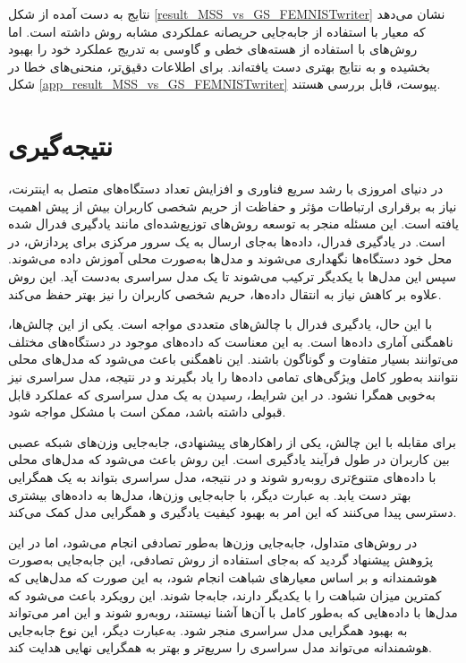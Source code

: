 نتایج به دست آمده از شکل
\ref{result_MSS_vs_GS_FEMNISTwriter}
نشان می‌دهد که معیار
با استفاده از جابه‌جایی حریصانه عملکردی مشابه روش
داشته است. اما روش‌های
با استفاده از هسته‌های خطی و گاوسی به تدریج عملکرد خود را بهبود بخشیده و به نتایج بهتری دست یافته‌اند. برای اطلاعات دقیق‌تر، منحنی‌های خطا در شکل
\ref{app_result_MSS_vs_GS_FEMNISTwriter}
پیوست، قابل بررسی هستند.




\section{نتیجه‌گیری}

در دنیای امروزی با رشد سریع فناوری و افزایش تعداد دستگاه‌های متصل به اینترنت، نیاز به برقراری ارتباطات مؤثر و حفاظت از حریم شخصی کاربران بیش از پیش اهمیت یافته است. این مسئله منجر به توسعه روش‌های توزیع‌شده‌ای مانند یادگیری فدرال شده است. در یادگیری فدرال، داده‌ها به‌جای ارسال به یک سرور مرکزی برای پردازش، در محل خود دستگاه‌ها نگهداری می‌شوند و مدل‌ها به‌صورت محلی آموزش داده می‌شوند. سپس این مدل‌ها با یکدیگر ترکیب می‌شوند تا یک مدل سراسری به‌دست آید. این روش علاوه بر کاهش نیاز به انتقال داده‌ها، حریم شخصی کاربران را نیز بهتر حفظ می‌کند.

با این حال، یادگیری فدرال با چالش‌های متعددی مواجه است. یکی از این چالش‌ها، ناهمگنی آماری داده‌ها است. به این معناست که داده‌های موجود در دستگاه‌های مختلف می‌توانند بسیار متفاوت و گوناگون باشند. این ناهمگنی باعث می‌شود که مدل‌های محلی نتوانند به‌طور کامل ویژگی‌های تمامی داده‌ها را یاد بگیرند و در نتیجه، مدل سراسری نیز به‌خوبی همگرا نشود. در این شرایط، رسیدن به یک مدل سراسری که عملکرد قابل قبولی داشته باشد، ممکن است با مشکل مواجه شود.

برای مقابله با این چالش، یکی از راهکارهای پیشنهادی، جابه‌جایی وزن‌های شبکه عصبی بین کاربران در طول فرآیند یادگیری است. این روش باعث می‌شود که مدل‌های محلی با داده‌های متنوع‌تری روبه‌رو شوند و در نتیجه، مدل سراسری بتواند به یک همگرایی بهتر دست یابد. به عبارت دیگر، با جابه‌جایی وزن‌ها، مدل‌ها به داده‌های بیشتری دسترسی پیدا می‌کنند که این امر به بهبود کیفیت یادگیری و همگرایی مدل کمک می‌کند.

در روش‌های متداول، جابه‌جایی وزن‌ها به‌طور تصادفی انجام می‌شود، اما در این پژوهش پیشنهاد گردید که به‌جای استفاده از روش تصادفی، این جابه‌جایی به‌صورت هوشمندانه و بر اساس معیارهای شباهت انجام شود، به این صورت که مدل‌هایی که کمترین میزان شباهت را با یکدیگر دارند، جابه‌جا شوند. این رویکرد باعث می‌شود که مدل‌ها با داده‌هایی که به‌طور کامل با آن‌ها آشنا نیستند، روبه‌رو شوند و این امر می‌تواند به بهبود همگرایی مدل سراسری منجر شود. به‌عبارت دیگر، این نوع جابه‌جایی هوشمندانه می‌تواند مدل سراسری را سریع‌تر و بهتر به همگرایی نهایی هدایت کند.

